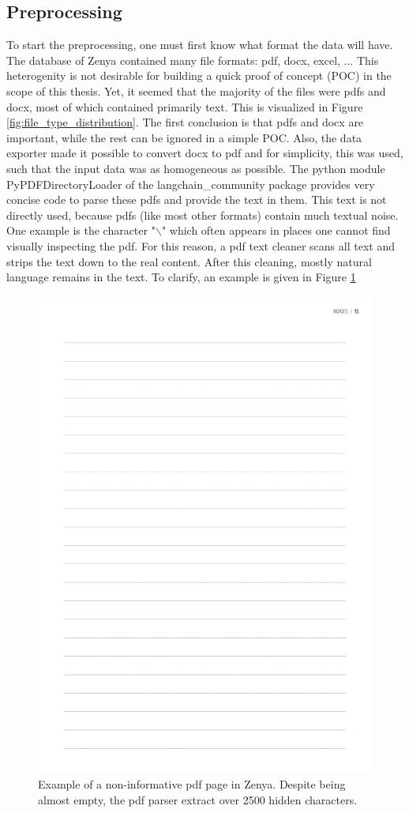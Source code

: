 \subsection{Preprocessing}
To start the preprocessing, one must first know what format the data will have. The database of Zenya contained many file formats: pdf, docx, excel, ... This heterogenity is not desirable for building a quick proof of concept (POC) in the scope of this thesis. Yet, it seemed that the majority of the files were pdfs and docx, most of which contained primarily text. This is visualized in Figure \ref{fig:file_type_distribution}. The first conclusion is that pdfs and docx are important, while the rest can be ignored in a simple POC. Also, the data exporter made it possible to convert docx to pdf and for simplicity, this was used, such that the input data was as homogeneous as possible. The python module PyPDFDirectoryLoader of the langchain\_community package  provides very concise code to parse these pdfs and provide the text in them. This text is not directly used, because pdfs (like most other formats) contain much textual noise. One example is the character "$\backslash$" which often appears in places one cannot find visually inspecting the pdf. For this reason, a pdf text cleaner scans all text and strips the text down to the real content. After this cleaning, mostly natural language remains in the text. To clarify, an example is given in Figure \ref{fig:pdf_clutter}

\begin{figure}[H]
    \centerline{\includegraphics[width=0.5\linewidth]{fig/pdf_clutter.png}}
    \caption{Example of a non-informative pdf page in Zenya. Despite being almost empty, the pdf parser extract over 2500 hidden characters.}
    \label{fig:pdf_clutter}
\end{figure}

